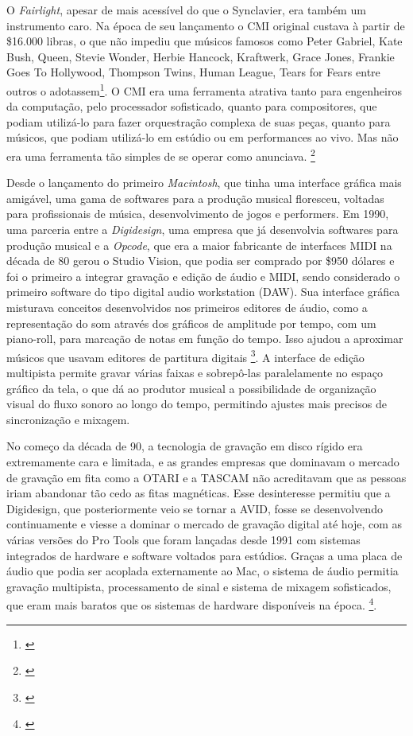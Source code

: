 O \emph{Fairlight}, apesar de mais acessível do que o Synclavier, era também um instrumento caro. Na época de seu lançamento o CMI original custava à partir de \$16.000 libras, o que não impediu que músicos famosos como Peter Gabriel, Kate Bush, Queen, Stevie Wonder, Herbie Hancock, Kraftwerk, Grace Jones, Frankie Goes To Hollywood, Thompson Twins, Human League, Tears for Fears entre outros o adotassem\footnote{\cite[18]{Twyman2004}}. O CMI era uma ferramenta atrativa tanto para engenheiros da computação, pelo processador sofisticado, quanto para compositores, que podiam utilizá-lo para fazer orquestração complexa de suas peças, quanto para músicos, que podiam utilizá-lo em estúdio ou em performances ao vivo. Mas não era uma ferramenta tão simples de se operar como anunciava. \footnote{\cite[55]{Twyman2004}}

Desde o lançamento do primeiro \emph{Macintosh}, que tinha uma interface gráfica mais amigável, uma gama de softwares para a produção musical floresceu, voltadas para profissionais de música, desenvolvimento de jogos e performers. Em 1990, uma parceria entre a \emph{Digidesign}, uma empresa que já desenvolvia softwares para produção musical e a \emph{Opcode}, que era a maior fabricante de interfaces MIDI na década de 80 gerou o Studio Vision, que podia ser comprado por \$950 dólares e foi o primeiro a integrar gravação e edição de áudio e MIDI, sendo considerado o primeiro software do tipo digital audio workstation (DAW). Sua interface gráfica misturava conceitos desenvolvidos nos primeiros editores de áudio, como a representação do som através dos gráficos de amplitude por tempo, com um piano-roll, para marcação de notas em função do tempo. Isso ajudou a aproximar músicos que usavam editores de partitura digitais \footnote{\cite{ChrisHalaby2011}}. A interface de edição multipista permite gravar várias faixas e sobrepô-las paralelamente no espaço gráfico da tela, o que dá ao produtor musical a possibilidade de organização visual do fluxo sonoro ao longo do tempo, permitindo ajustes mais precisos de sincronização e mixagem.

No começo da década de 90, a tecnologia de gravação em disco rígido era extremamente cara e limitada, e as grandes empresas que dominavam o mercado de gravação em fita como a OTARI e a TASCAM não acreditavam que as pessoas iriam abandonar tão cedo as fitas magnéticas. Esse desinteresse permitiu que a Digidesign, que posteriormente veio se tornar a AVID, fosse se desenvolvendo continuamente e viesse a dominar o mercado de gravação digital até hoje, com as várias versões do Pro Tools que foram lançadas desde 1991 com sistemas integrados de hardware e software voltados para estúdios. Graças a uma placa de áudio que podia ser acoplada externamente ao Mac, o sistema de áudio permitia gravação multipista, processamento de sinal e sistema de mixagem sofisticados, que eram mais baratos que os sistemas de hardware disponíveis na época. \footnote{\cite{ChrisHalaby2011}}.

